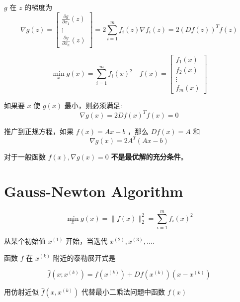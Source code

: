     $ g $ 在 $ z $ 的梯度为
    $$
    \nabla g(z)=\left[\begin{array}{c}
    \frac{\partial g}{\partial x_{1}}(z) \\
    \vdots \\
    \frac{\partial g}{\partial x_{n}}(z)
    \end{array}\right]=2 \sum_{i=1}^{m} f_{i}(z) \nabla f_{i}(z)=2(D f(z))^{T} f(z)
    $$

\begin{theorem}[非线性最小二乘问题的最优必要条件]
        $$
    \min _{x} g(x)=\sum_{i=1}^{m} f_{i}(x)^{2} \quad f(x)=\left[\begin{array}{c}
    f_{1}(x) \\
    f_{2}(x) \\
    \vdots \\
    f_{m}(x)
    \end{array}\right]
    $$

    如果要 $ x $ 使 $ g(x) $ 最小，则必须满足:
    $$
    \nabla g(x)=2 D f(x)^{T} f(x)=0
    $$
\end{theorem}

\begin{corollary}[正规方程的最优必要条件]
    推广到正规方程，如果 $ f(x)=A x-b $ ，那么 $ D f(x)=A $ 和
$$
\nabla g(x)=2 A^{T}(A x-b)
$$
\end{corollary}

\begin{remark}
    对于一般函数 $ f(x), \nabla g(x)=0 $ \textbf{不是最优解的充分条件}。
\end{remark}



\section{Gauss-Newton Algorithm}

\begin{problem}
    $$
\min _{x} g(x)=\|f(x)\|_{2}^{2}=\sum_{i=1}^{m} f_{i}(x)^{2}
$$

从某个初始值 $ x^{(1)} $ 开始，当迭代 $ x^{(2)}, x^{(3)}, \ldots $.
\end{problem}

函数 $ f $ 在 $ x^{(k)} $ 附近的泰勒展开式是

$$
\hat{f}\left(x ; x^{(k)}\right)=f\left(x^{(k)}\right)+D f\left(x^{(k)}\right)\left(x-x^{(k)}\right)
$$

用仿射近似 $ \hat{f}\left(x, x^{(k)}\right) $ 代替最小二乘法问题中函数 $ f(x) $

